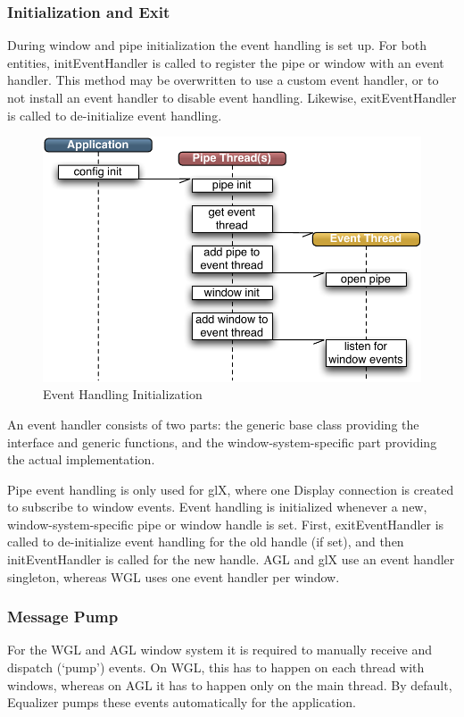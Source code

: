 \documentclass[10pt,a4]{scrartcl}
\begin{document}
\subsubsection{Initialization and Exit}

During window and pipe initialization the event handling is set up. For
both entities, \textsf{initEvent\-Handler} is called to register the
pipe or window with an event handler. This method may be overwritten to
use a custom event handler, or to not install an event handler to
disable event handling. Likewise, \textsf{exitEventHandler} is called to
de-initialize event handling.

\begin{figure}
  \includegraphics[width=.4\textwidth]{images/eventInit.pdf}
  {\caption{\small\label{fEventInit}Event Handling Initialization}}
\end{figure}
An event handler consists of two parts: the generic base class providing
the interface and generic functions, and the window-system-specific
part providing the actual implementation. 

Pipe event handling is only used for glX, where one \textsf{Display}
connection is created to subscribe to window events. Event handling is
initialized whenever a new, window-system-specific pipe or window handle
is set. First, \textsf{exitEventHandler} is called to de-initialize
event handling for the old handle (if set), and then
\textsf{initEvent\-Handler} is called for the new handle. AGL and glX use
an event handler singleton, whereas WGL uses one event handler per
window.

\subsubsection{Message Pump}

For the WGL and AGL window system it is required to manually receive and
dispatch (`pump') events. On WGL, this has to happen on each thread with
windows, whereas on AGL it has to happen only on the main thread. By
default, Equalizer pumps these events automatically for the application.
\end{document}
